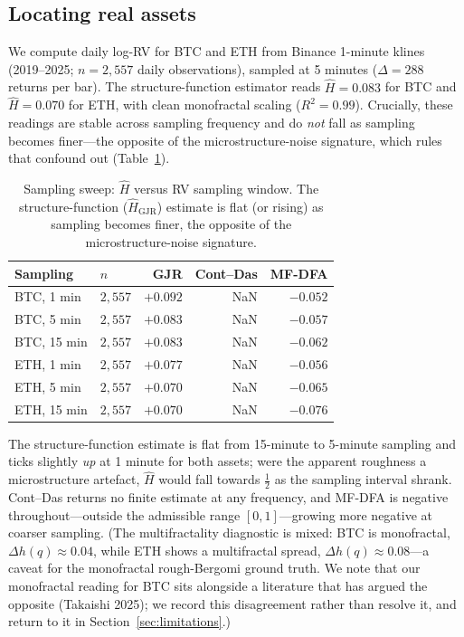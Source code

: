 \documentclass[11pt]{article}
\begin{document}
\subsection{Locating real assets}
\label{sec:assets}

We compute daily log-RV for BTC and ETH from Binance 1-minute klines (2019--2025;
$n = 2{,}557$ daily observations), sampled at 5 minutes ($\Delta = 288$ returns per
bar). The structure-function estimator reads $\hat H = 0.083$ for BTC and
$\hat H = 0.070$ for ETH, with clean monofractal scaling ($R^2 = 0.99$). Crucially,
these readings are stable across sampling frequency and do \emph{not} fall as
sampling becomes finer---the opposite of the microstructure-noise signature, which
rules that confound out (Table~\ref{tab:sweep}).

\begin{table}[t]
\centering
\caption{Sampling sweep: $\hat H$ versus RV sampling window. The structure-function
($\hat H_{\mathrm{GJR}}$) estimate is flat (or rising) as sampling becomes finer,
the opposite of the microstructure-noise signature.}
\label{tab:sweep}
\begin{tabular}{llrrr}
\toprule
Sampling & $n$ & GJR & Cont--Das & MF-DFA \\
\midrule
BTC, 1 min  & $2{,}557$ & $+0.092$ & NaN & $-0.052$ \\
BTC, 5 min  & $2{,}557$ & $+0.083$ & NaN & $-0.057$ \\
BTC, 15 min & $2{,}557$ & $+0.083$ & NaN & $-0.062$ \\
ETH, 1 min  & $2{,}557$ & $+0.077$ & NaN & $-0.056$ \\
ETH, 5 min  & $2{,}557$ & $+0.070$ & NaN & $-0.065$ \\
ETH, 15 min & $2{,}557$ & $+0.070$ & NaN & $-0.076$ \\
\bottomrule
\end{tabular}
\end{table}

The structure-function estimate is flat from 15-minute to 5-minute sampling and
ticks slightly \emph{up} at 1 minute for both assets; were the apparent roughness a
microstructure artefact, $\hat H$ would fall towards $\tfrac{1}{2}$ as the sampling
interval shrank. Cont--Das returns no finite estimate at any frequency, and MF-DFA
is negative throughout---outside the admissible range $[0, 1]$---growing more
negative at coarser sampling. (The multifractality diagnostic is mixed: BTC is
monofractal, $\Delta h(q) \approx 0.04$, while ETH shows a multifractal spread,
$\Delta h(q) \approx 0.08$---a caveat for the monofractal rough-Bergomi ground
truth. We note that our monofractal reading for BTC sits alongside a literature
that has argued the opposite (Takaishi 2025); we record this disagreement rather
than resolve it, and return to it in Section~\ref{sec:limitations}.)
\end{document}
